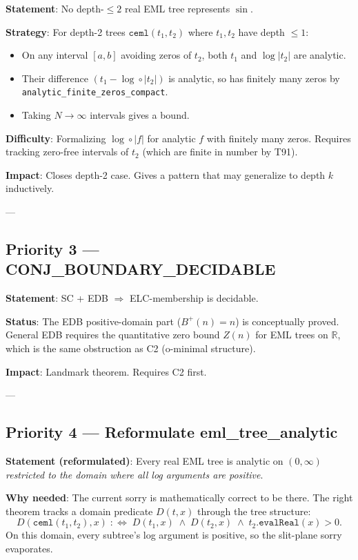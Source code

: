 \documentclass[12pt]{article}
\theoremstyle{definition}
\begin{document}
\textbf{Statement}: No depth-$\leq 2$ real EML tree represents $\sin$.

\textbf{Strategy}: For depth-2 trees $\texttt{ceml}(t_1, t_2)$ where $t_1, t_2$ have depth $\leq 1$:
\begin{itemize}
  \item On any interval $[a,b]$ avoiding zeros of $t_2$, both $t_1$ and $\log|t_2|$ are analytic.
  \item Their difference $(t_1 - \log \circ |t_2|)$ is analytic, so has finitely many zeros by
        \texttt{analytic\_finite\_zeros\_compact}.
  \item Taking $N \to \infty$ intervals gives a bound.
\end{itemize}

\textbf{Difficulty}: Formalizing $\log \circ |f|$ for analytic $f$ with finitely many zeros.
Requires tracking zero-free intervals of $t_2$ (which are finite in number by T91).

\textbf{Impact}: Closes depth-2 case. Gives a pattern that may generalize to depth $k$ inductively.

---

\subsection{\textcolor{med}{Priority 3 — CONJ\_BOUNDARY\_DECIDABLE}}

\textbf{Statement}: SC + EDB $\Rightarrow$ ELC-membership is decidable.

\textbf{Status}: The EDB positive-domain part ($B^+(n) = n$) is conceptually proved.
General EDB requires the quantitative zero bound $Z(n)$ for EML trees on $\mathbb{R}$,
which is the same obstruction as C2 (o-minimal structure).

\textbf{Impact}: Landmark theorem. Requires C2 first.

---

\subsection{\textcolor{med}{Priority 4 — Reformulate eml\_tree\_analytic}}

\textbf{Statement (reformulated)}: Every real EML tree is analytic on $(0,\infty)$ \emph{restricted
to the domain where all log arguments are positive}.

\textbf{Why needed}: The current sorry is mathematically correct to be there.
The right theorem tracks a domain predicate $D(t, x)$ through the tree structure:
\[
  D(\texttt{ceml}(t_1, t_2), x) \;:\iff\; D(t_1, x) \;\wedge\; D(t_2, x) \;\wedge\; t_2.\texttt{evalReal}(x) > 0.
\]
On this domain, every subtree's log argument is positive, so the slit-plane sorry evaporates.
\end{document}
